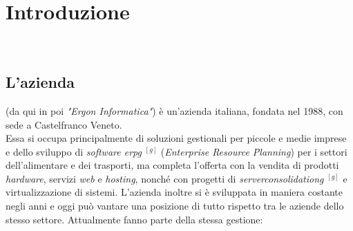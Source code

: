 

\chapter{Introduzione}
\label{cap:introduzione}

\noindent {}\\





\section{L'azienda}

\noindent{\myCompany} \cite{siteB:ergon-informatica}
(da qui in poi
\textit{"Ergon Informatica"}) è un'azienda italiana, fondata nel 1988, 
con sede a Castelfranco Veneto.\\
Essa si occupa principalmente di soluzioni gestionali per piccole e medie imprese e dello sviluppo di
\textit{software \gls{erpg}} $^{[g]}$ (\textit{Enterprise Resource Planning}) per i settori dell'alimentare e dei trasporti,
ma completa l'offerta con la vendita di prodotti
\textit{hardware}, servizi \textit{web} e \textit{hosting}, nonché con progetti di \textit{\gls{serverconsolidationg}} $^{[g]}$ e virtualizzazione di
sistemi.
L'azienda inoltre si è sviluppata in maniera costante negli anni e oggi può vantare una posizione di tutto rispetto tra le aziende dello stesso settore.
Attualmente fanno parte della stessa gestione:

